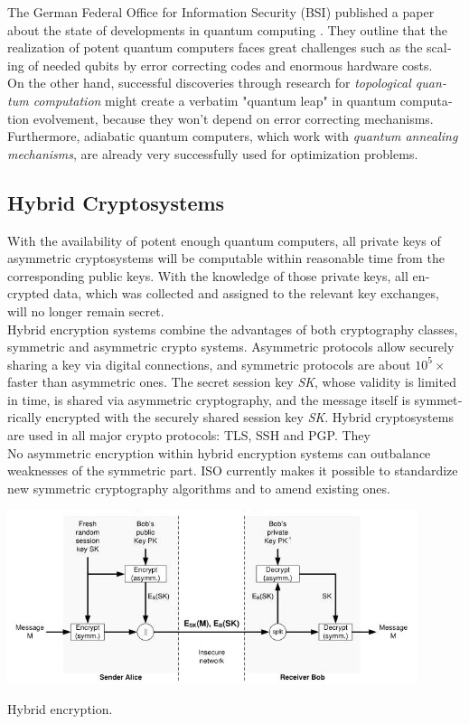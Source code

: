\documentclass[a4paper,11pt]{article}
\begin{document}
\begin{otherlanguage}{english}
\noindent
The German Federal Office for Information Security (BSI) published a paper about the state of developments in quantum computing \cite{BSI}. They outline that the realization of potent quantum computers faces great challenges such as the scaling of needed qubits by error correcting codes and enormous hardware costs. \\
On the other hand, successful discoveries through research for \textit{topological quantum computation} \cite{TQB} might create a verbatim "quantum leap" in quantum computation evolvement, because they won't depend on error correcting mechanisms. Furthermore, adiabatic quantum computers, which work with \textit{quantum annealing mechanisms}, are already very successfully used for optimization problems.\\

\subsection{Hybrid Cryptosystems}

\noindent
With the availability of potent enough quantum computers, all private keys of asymmetric cryptosystems will be computable within reasonable time from the corresponding public keys. With the knowledge of those private keys, all encrypted data, which was collected and assigned to the relevant key exchanges, will no longer remain secret. \\

\noindent
Hybrid encryption systems combine the advantages of both cryptography classes, symmetric and asymmetric crypto systems. Asymmetric protocols allow securely sharing a key via digital connections, and symmetric protocols are about $10^5 \times$ faster than asymmetric ones. The secret session key \textit{SK}, whose validity is limited in time, is shared via asymmetric cryptography, and the message itself is symmetrically encrypted with the securely shared session key \textit{SK}. Hybrid cryptosystems are used in all major crypto protocols: TLS, SSH and PGP. They\\

\noindent
No asymmetric encryption within hybrid encryption systems can outbalance weaknesses of the symmetric part. ISO currently makes it possible to standardize new symmetric cryptography algorithms and to amend existing ones. \\

\begin{figurehere}
  \centering
  \includegraphics[width=12cm]{hybrid-encryption.jpg}
  \caption{Hybrid encryption.\label{abb_2}}
\end{figurehere}


\end{otherlanguage}
\end{document}
